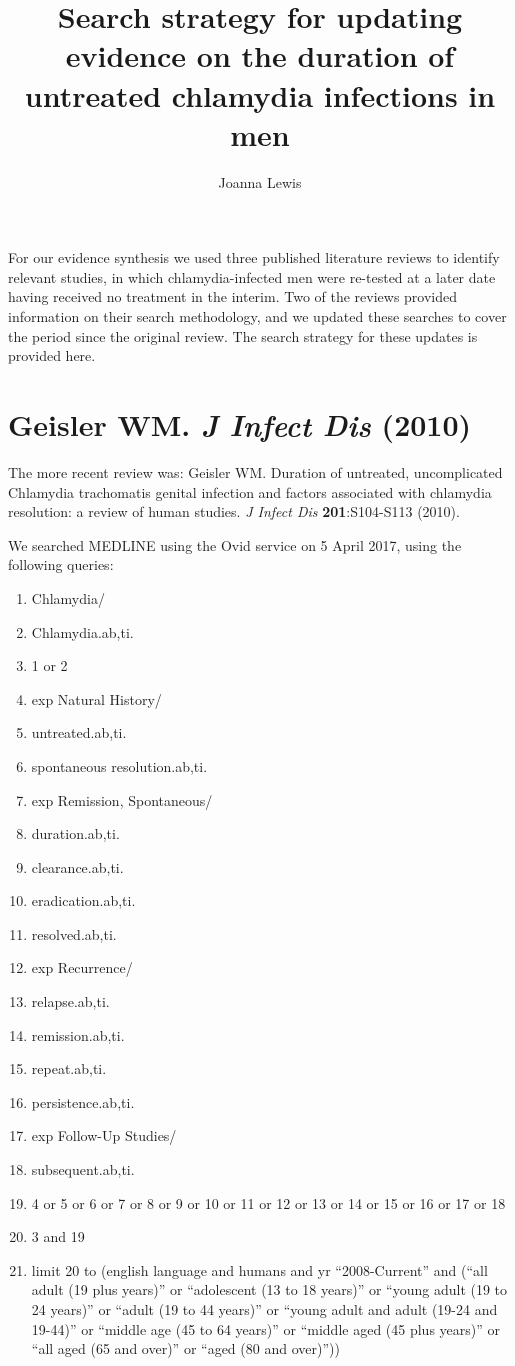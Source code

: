 \documentclass[11pt, oneside]{article}   	%
\title{Search strategy  for updating evidence on the duration of untreated chlamydia infections in men}
\author{Joanna Lewis}
\begin{document}
\maketitle

For our evidence synthesis we used three published literature reviews to identify relevant studies, in which chlamydia-infected men were re-tested at a later date having received no treatment in the interim. Two of the reviews provided information on their search methodology, and we updated these searches to cover the period since the original review. The search strategy for these updates is provided here.

\section{Geisler WM. \textit{J Infect Dis} (2010)}

The more recent review was: Geisler WM. Duration of untreated, uncomplicated Chlamydia trachomatis genital infection and factors associated with chlamydia resolution: a review of human studies. \textit{J Infect Dis} \textbf{201}:S104-S113 (2010).

We searched MEDLINE using the Ovid service on 5 April 2017, using the following queries:

\begin{enumerate}

\item{Chlamydia/}
\item{Chlamydia.ab,ti.}
\item{1 or 2}
\item{exp Natural History/}
\item{untreated.ab,ti.}
\item{spontaneous resolution.ab,ti.}
\item{exp Remission, Spontaneous/}
\item{duration.ab,ti.}
\item{clearance.ab,ti.}
\item{eradication.ab,ti.}
\item{resolved.ab,ti.}
\item{exp Recurrence/}
\item{relapse.ab,ti.}
\item{remission.ab,ti.}
\item{repeat.ab,ti.}
\item{persistence.ab,ti.}
\item{exp Follow-Up Studies/}
\item{subsequent.ab,ti.}
\item{4 or 5 or 6 or 7 or 8 or 9 or 10 or 11 or 12 or 13 or 14 or 15 or 16 or 17 or 18}
\item{3 and 19}
\item{limit 20 to (english language and humans and yr ``2008-Current'' and (``all adult (19 plus years)'' or ``adolescent (13 to 18 years)'' or ``young adult (19 to 24 years)'' or ``adult (19 to 44 years)'' or ``young adult and adult (19-24 and 19-44)'' or ``middle age (45 to 64 years)'' or ``middle aged (45 plus years)'' or ``all aged (65 and over)'' or ``aged (80 and over)''))}

\end{enumerate}
\end{document}
